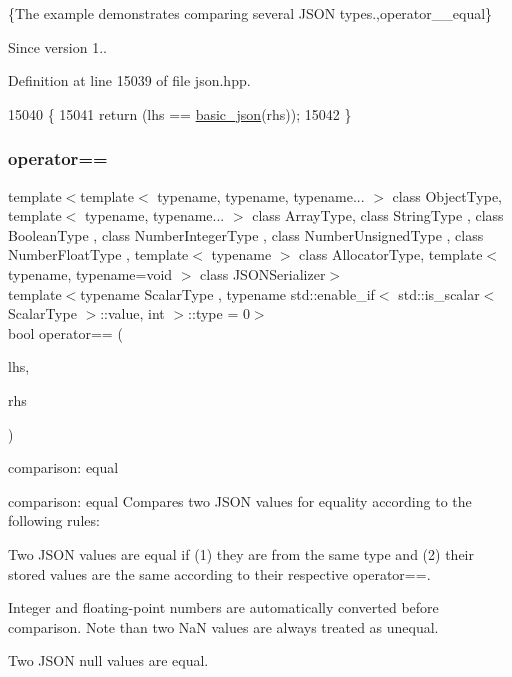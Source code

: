\{The example demonstrates comparing several J\+S\+ON types.,operator\+\_\+\+\_\+equal\}

\begin{DoxySince}{Since}
version 1.. 
\end{DoxySince}


Definition at line 15039 of file json.\+hpp.


\begin{DoxyCode}
15040     \{
15041         \textcolor{keywordflow}{return} (lhs == \hyperlink{classnlohmann_1_1basic__json_aed115142bd0c6c66c864700e0467df55}{basic\_json}(rhs));
15042     \}
\end{DoxyCode}
\mbox{\label{classnlohmann_1_1basic__json_aef302e3ae215e46e5035d0e4fdf47235}} 
\subsubsection{\texorpdfstring{operator==}{operator==}\hspace{0.1cm}{\footnotesize\ttfamily [3/3]}}
{\footnotesize\ttfamily template$<$template$<$ typename, typename, typename... $>$ class Object\+Type, template$<$ typename, typename... $>$ class Array\+Type, class String\+Type , class Boolean\+Type , class Number\+Integer\+Type , class Number\+Unsigned\+Type , class Number\+Float\+Type , template$<$ typename $>$ class Allocator\+Type, template$<$ typename, typename=void $>$ class J\+S\+O\+N\+Serializer$>$ \\
template$<$typename Scalar\+Type , typename std\+::enable\+\_\+if$<$ std\+::is\+\_\+scalar$<$ Scalar\+Type $>$\+::value, int $>$\+::type  = 0$>$ \\
bool operator== (\begin{DoxyParamCaption}\item[{const Scalar\+Type}]{lhs,  }\item[{\hyperlink{classnlohmann_1_1basic__json_a4057c5425f4faacfe39a8046871786ca}{const\+\_\+reference}}]{rhs }\end{DoxyParamCaption})\hspace{0.3cm}{\ttfamily [friend]}}



comparison\+: equal 

comparison\+: equal Compares two J\+S\+ON values for equality according to the following rules\+:
\begin{DoxyItemize}
\item Two J\+S\+ON values are equal if (1) they are from the same type and (2) their stored values are the same according to their respective {\ttfamily operator==}.
\item Integer and floating-\/point numbers are automatically converted before comparison. Note than two NaN values are always treated as unequal.
\item Two J\+S\+ON null values are equal.
\end{DoxyItemize}

